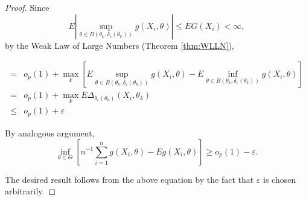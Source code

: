 \begin{proof}
	Since
	\begin{equation*}
		E\left|\sup_{\theta\in B\left(\theta_{k},\delta_{c}\left(\theta_{k}\right)\right)}g\left(X_{i},\theta\right)\right|\leq EG\left(X_{i}\right)<\infty,
	\end{equation*}
	by the Weak Law of Large Numbers (Theorem \ref{thm:WLLN}),

	\begin{equation*}
		\begin{aligned}
			=    & o_{p}(1)+\max_{k}\left[E\sup_{\theta\in B\left(\theta_{k},\delta_{\varepsilon}\left(\theta_{k}\right)\right)}g\left(X_{i},\theta\right)-E\inf_{\theta\in B\left(\theta_{k},\delta_{\varepsilon}\left(\theta_{k}\right)\right)}g\left(X_{i},\theta\right)\right] \\
			=    & o_{p}(1)+\max_{k}E\Delta_{\delta_{\varepsilon}\left(\theta_{k}\right)}\left(X_{i},\theta_{k}\right)                                                                                                                                                             \\
			\leq & o_{p}(1)+\varepsilon
		\end{aligned}
	\end{equation*}

	By analogous argument,
	\begin{equation*}
		\inf_{\theta\in\Theta}\left[n^{-1}\sum_{i=1}^{n}g\left(X_{i},\theta\right)-Eg\left(X_{i},\theta\right)\right]\geq o_{p}(1)-\varepsilon.
	\end{equation*}

	The desired result follows from the above equation by the fact that $\varepsilon$ is chosen arbitrarily.
\end{proof}
